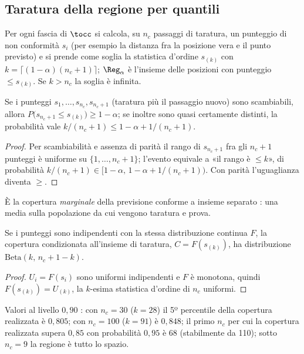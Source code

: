 \subsection{Taratura della regione per quantili}\label{sec:val-taratura}

Per ogni fascia di $\tocc$ si calcola, su $n_c$ passaggi di taratura, un punteggio di non conformità $s_i$ (per esempio la distanza fra la posizione vera e il punto previsto) e si prende come soglia la statistica d'ordine $s_{(k)}$ con $k=\lceil(1-\alpha)(n_c+1)\rceil$; $\Reg_\alpha$ è l'insieme delle posizioni con punteggio $\le s_{(k)}$. Se $k>n_c$ la soglia è infinita.

\begin{proposizione}\label{prop:val-marginale}
Se i punteggi $s_1,\dots,s_{n_c},s_{n_c+1}$ (taratura più il passaggio nuovo) sono scambiabili, allora $P\bigl(s_{n_c+1}\le s_{(k)}\bigr)\ge1-\alpha$; se inoltre sono quasi certamente distinti, la probabilità vale $k/(n_c+1)\le1-\alpha+1/(n_c+1)$. 
\end{proposizione}
\begin{proof}
Per scambiabilità e assenza di parità il rango di $s_{n_c+1}$ fra gli $n_c+1$ punteggi è uniforme su $\{1,\dots,n_c+1\}$; l'evento equivale a «il rango è $\le k$», di probabilità $k/(n_c+1)\in[1-\alpha,\,1-\alpha+1/(n_c+1))$. Con parità l'uguaglianza diventa $\ge$.
\end{proof}
È la copertura \emph{marginale} della previsione conforme a insieme separato \cite{angelopoulos2021}: una media sulla popolazione da cui vengono taratura e prova.

\begin{proposizione}\label{prop:val-beta}
Se i punteggi sono indipendenti con la stessa distribuzione continua $F$, la copertura condizionata all'insieme di taratura, $C=F(s_{(k)})$, ha distribuzione $\mathrm{Beta}(k,\,n_c+1-k)$. 
\end{proposizione}
\begin{proof}
$U_i=F(s_i)$ sono uniformi indipendenti e $F$ è monotona, quindi $F(s_{(k)})=U_{(k)}$, la $k$-esima statistica d'ordine di $n_c$ uniformi.
\end{proof}
Valori al livello $0{,}90$ : con $n_c=30$ ($k=28$) il 5º percentile della copertura realizzata è $0{,}805$; con $n_c=100$ ($k=91$) è $0{,}848$; il primo $n_c$ per cui la copertura realizzata supera $0{,}85$ con probabilità $0{,}95$ è 68 (stabilmente da 110); sotto $n_c=9$ la regione è tutto lo spazio.

